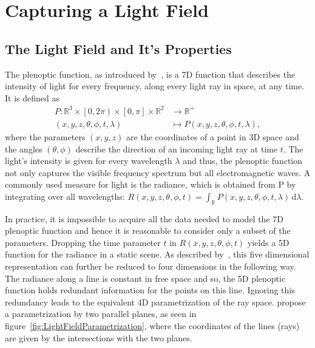 \chapter{Capturing a Light Field}

\section{The Light Field and It's Properties}

The plenoptic function, as introduced by~\cite{AdelsonBergen}, is a 7D function that describes the intensity of light for every frequency, along every light ray in space, at any time. 
It is defined as
\begin{align*}
	P \colon \mathbb{R}^3 \times \left[0, 2 \pi \right) \times \left[ 0, \pi \right] \times \mathbb{R}^2 & \to \mathbb{R}^+ \\
	\left(x, y, z, \theta, \phi, t, \lambda \right) & \mapsto P\left(x, y, z, \theta, \phi, t, \lambda \right), 
\end{align*}
where the parameters $\left(x, y, z\right)$ are the coordinates of a point in 3D space and the angles $\left(\theta, \phi \right)$ describe the direction of an incoming light ray at time $t$. 
The light's intensity is given for every wavelength $\lambda$ and thus, the plenoptic function not only captures the visible frequency spectrum but all electromagnetic waves. 
A commonly used measure for light is the radiance, which is obtained from P by integrating over all wavelengths: 
$R\left(x, y, z, \theta, \phi, t\right) = \int_{\mathbb{R}} \! P\left(x, y, z, \theta, \phi, t, \lambda \right) \, \mathrm{d} \lambda$.

In practice, it is impossible to acquire all the data needed to model the 7D plenoptic function and hence it is reasonable to consider only a subset of the parameters. 
Dropping the time parameter $t$ in $R\left( x, y, z, \theta, \phi, t \right) $ yields a 5D function for the radiance in a static scene. 
As described by~\cite{LightFieldRendering}, this five dimensional representation can further be reduced to four dimensions in the following way. The radiance along a line is constant in free space and so, the 5D plenoptic function holds redundant information for the points on this line. 
Ignoring this redundancy leads to the equivalent 4D parametrization of the ray space. 
\cite{LightFieldRendering} propose a parametrization by two parallel planes, as seen in figure~\ref{fig:LightFieldParametrization}, where the coordinates of the lines (rays) are given by the intersections with the two planes.


